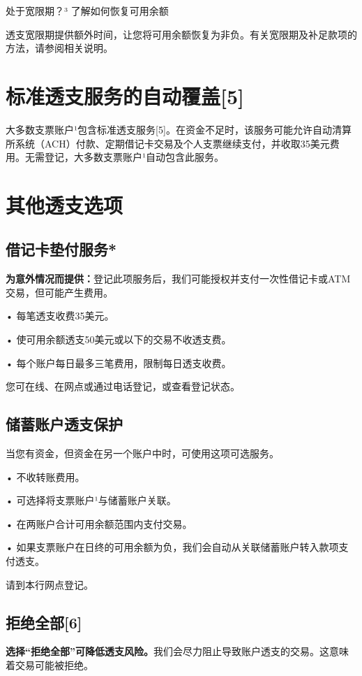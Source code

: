 \documentclass[UTF8,fontset=none,11pt,a4paper]{ctexart}
\begin{document}
处于宽限期？³ 了解如何恢复\allowbreak\mbox{可用余额}


透支宽限期提供额外时间，让您将可用余额恢复为非负。有关宽限期及补足款项的方法，请参阅\allowbreak\mbox{相关说明。}


\section*{标准透支服务的自动覆盖[5]}
大多数支票账户¹包含标准透支服务[5]。在资金不足时，该服务可能允许自动清算所系统（ACH）付款、定期借记卡交易及个人支票继续支付，并收取35美元费用。无需登记，大多数支票账户¹自动包含\allowbreak\mbox{此服务。}


\section*{其他透支选项}
\subsection*{借记卡垫付服务*}
\textbf{为意外情况而提供：}登记此项服务后，我们可能授权并支付一次性借记卡或ATM交易，但可能\allowbreak\mbox{产生费用。}


• 每笔透支收费35美元。


• 使可用余额透支50美元或以下的交易不\allowbreak\mbox{收透支费。}


• 每个账户每日最多三笔费用，限制每日\allowbreak\mbox{透支收费。}


您可在线、在网点或通过电话登记，或查看\allowbreak\mbox{登记状态。}


\subsection*{储蓄账户透支保护}
当您有资金，但资金在另一个账户中时，可使用这项\allowbreak\mbox{可选服务。}


• 不收\allowbreak\mbox{转账费用。}


• 可选择将支票账户¹与储蓄\allowbreak\mbox{账户关联。}


• 在两账户合计可用余额范围内\allowbreak\mbox{支付交易。}


• 如果支票账户在日终的可用余额为负，我们会自动从关联储蓄账户转入款项\allowbreak\mbox{支付透支。}


请到本行\allowbreak\mbox{网点登记。}


\subsection*{拒绝全部[6]}
\textbf{选择“拒绝全部”可降低透支风险。}我们会尽力阻止导致账户透支的交易。这意味着交易可\allowbreak\mbox{能被拒绝。}
\end{document}
